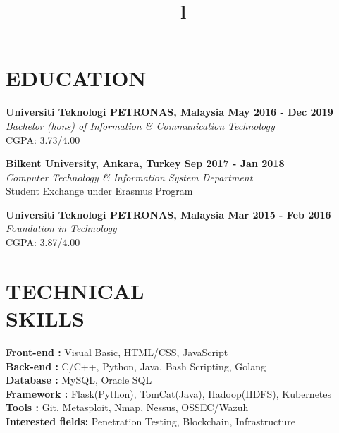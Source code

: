 \documentclass[margin]{res}
\begin{document}
\begin{resume}
\section{EDUCATION}
\textbf{Universiti Teknologi PETRONAS, Malaysia
\hfill{May 2016 - Dec 2019}} \\
{\sl Bachelor (hons) of Information \& Communication Technology} \\
\hfill CGPA: 3.73/4.00

\textbf{Bilkent University, Ankara, Turkey
\hfill{Sep 2017 - Jan 2018}} \\
{\sl Computer Technology \& Information System Department} \\
\hfill Student Exchange under Erasmus Program

\textbf{Universiti Teknologi PETRONAS, Malaysia 
\hfill{Mar 2015 - Feb 2016}} \\
{\sl Foundation in Technology} \\
\hfill CGPA: 3.87/4.00

\section{TECHNICAL\\SKILLS}
\textbf{Front-end : } \quad \quad 
Visual Basic, HTML/CSS, JavaScript
\\
\textbf{Back-end :} \quad \quad \quad 
C/C++, Python, Java, Bash Scripting, Golang
\\
\textbf{Database :} \quad \quad \quad 
MySQL, Oracle SQL
\\
\textbf{Framework :} \quad \quad 
Flask(Python), TomCat(Java), Hadoop(HDFS), Kubernetes
\\
\textbf{Tools :} \quad  \quad \quad \quad \quad 
Git, Metasploit, Nmap, Nessus, OSSEC/Wazuh
\\
\textbf{Interested fields: } Penetration Testing, Blockchain, Infrastructure
\begin{format}
\title{l}\\
\\
\body\\
\end{format}

\end{resume}
\end{document}
